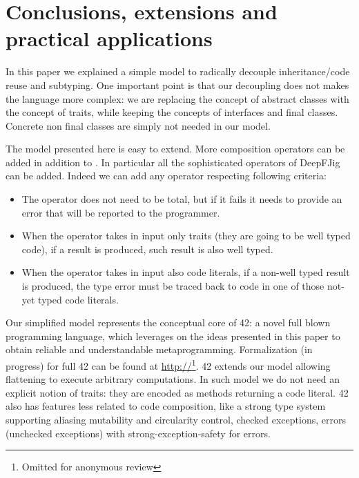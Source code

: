 \section{Conclusions, extensions and practical applications}

In this paper we explained a simple model to 
radically decouple inheritance/code reuse and subtyping.
One important point is that our decoupling does not
makes the language more complex:
we are replacing the concept of abstract classes with
the concept of traits, while keeping the concepts of
interfaces and final classes.
Concrete non final classes are simply not needed in our model.

The model presented here is easy to extend.
More composition operators can be added in addition to \use.
In particular all the sophisticated operators of DeepFJig can be added.
 Indeed we can add any operator respecting following criteria:

\begin{itemize}
\item The operator does not need to be total, but if it fails it needs to provide an error that will be reported to the programmer.
\item When the operator takes in input only traits (they are going to be well typed code), if a result is produced,
 such result is also well typed.
\item When the operator takes in input also code literals, if a non-well typed result is produced,
the type error must be traced back to code in one of those not-yet typed code literals.
 \end{itemize}
 

 
 Our simplified model represents the conceptual core of  42: a novel full blown programming language,
which leverages on the ideas presented in this paper to obtain reliable and understandable metaprogramming.
Formalization (in progress) for full 42 can be found at
\url{http://}\footnote{Omitted for anonymous review}. 
42 extends our model allowing
flattening to execute arbitrary computations.
In such model we do not need an explicit notion of traits: they are encoded as methods returning a code literal.
42 also has features less related to code composition, like
  a strong type system supporting aliasing mutability and circularity control,
   checked exceptions, errors (unchecked exceptions) with strong-exception-safety for errors.

\begin{comment}
42 do not have a finite set of composition operators; they can be
added using the built in support for native method calls. They can
be dynamically checked to verify that they are well behaved
according to our predicate, or they can be trusted to achieve
efficiency.
\end{comment}

